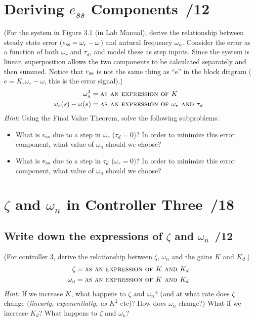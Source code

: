 \documentclass{article}
\newcommand{\score}{\hfill \underline{\hspace{0.65cm}}\,/} %
\begin{document}
\section{{\sc Deriving $e_{ss}$ Components} \score 12}
(For the system in Figure 3.1 (in Lab Manual), derive the relationship between steady state error ($e_{\rm ss}= \omega_r - \omega$) and natural frequency $\omega_n$. Consider the error as a function of both $\omega_r$ and $\tau_d$, and model these as step inputs. Since the system is linear, superposition allows the two components to be calculated separately and then summed. Notice that $e_{\rm ss}$ is not the same thing as ``e'' in the block diagram ($e= K_r\omega_r - \omega$, this is the error signal).)
\begin{align*}
  \omega_n^2 & = \mbox{\sc as an expression of $K$} \\
  \omega_r(s) - \omega(s) & = \mbox{\sc as an expression of $\omega_r$ and $\tau_d$}
\end{align*}
\emph{Hint}: Using the Final Value Theorem, solve the following subproblems:
\begin{itemize}
\item What is $e_{\rm ss}$ due to a step in $\omega_r$ ($\tau_d = 0$)? In order to minimize this error component, what value of $\omega_n$ should we choose?
\item What is $e_{\rm ss}$ due to a step in $\tau_d$ ($\omega_r = 0$)? In order to minimize this error component, what value of $\omega_n$ should we choose?
\end{itemize}

\section{{\sc $\zeta$ and $\omega_n$ in Controller Three} \score 18}
\subsection{Write down the expressions of $\zeta$ and $\omega_n$ \score 12}
(For controller 3, derive the relationship between $\zeta$, $\omega_n$ and the gains $K$ and $K_d$.)
\begin{align*}
\zeta & = \mbox{\sc as an expression of $K$ and $K_d$} \\  
\omega_n & = \mbox{\sc as an expression of $K$ and $K_d$}  
\end{align*}
\emph{Hint:} If we increase $K$, what happens to $\zeta$ and $\omega_n$? (and at what rate does $\zeta$ change (\emph{linearly, exponentially, as $K^2$} etc)? How does $\omega_n$ change?) What if we increase $K_d$? What happens to $\zeta$ and $\omega_n$?
\end{document}
